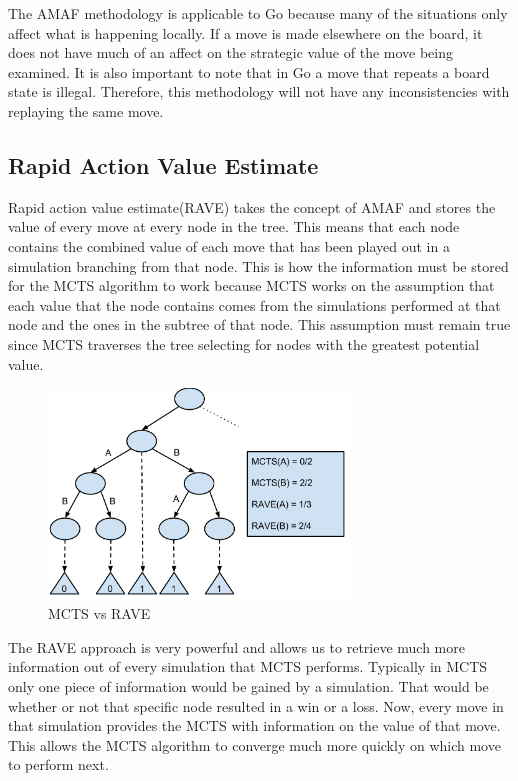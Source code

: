 \documentclass{sig-alternate}
\begin{document}
The AMAF methodology is applicable to Go because many of the situations only affect what is happening locally. If a move is made elsewhere on the board, it does not have much of an affect on the strategic value of the move being examined. It is also important to note that in Go a move that repeats a board state is illegal. Therefore, this methodology will not have any inconsistencies with replaying the same move.

\subsection{Rapid Action Value Estimate}
Rapid action value estimate(RAVE) takes the concept of AMAF and stores the value of every move at every node in the tree. This means that each node contains the combined value of each move that has been played out in a simulation branching from that node. This is how the information must be stored for the MCTS algorithm to work because MCTS works on the assumption that each value that the node contains comes from the simulations performed at that node and the ones in the subtree of that node. This assumption must remain true since MCTS traverses the tree selecting for nodes with the greatest potential value.

\begin{figure}[h]
	\includegraphics[width=8cm]{RAVEDiagram.pdf}
	\centering
	\caption{MCTS vs RAVE}
	\label{fig:RAVEDiagram}
\end{figure} 

The RAVE approach is very powerful and allows us to retrieve much more information out of every simulation that MCTS performs. Typically in MCTS only one piece of information would be gained by a simulation. That would be whether or not that specific node resulted in a win or a loss. Now, every move in that simulation provides the MCTS with information on the value of that move. This allows the MCTS algorithm to converge much more quickly on which move to perform next.
\end{document}

